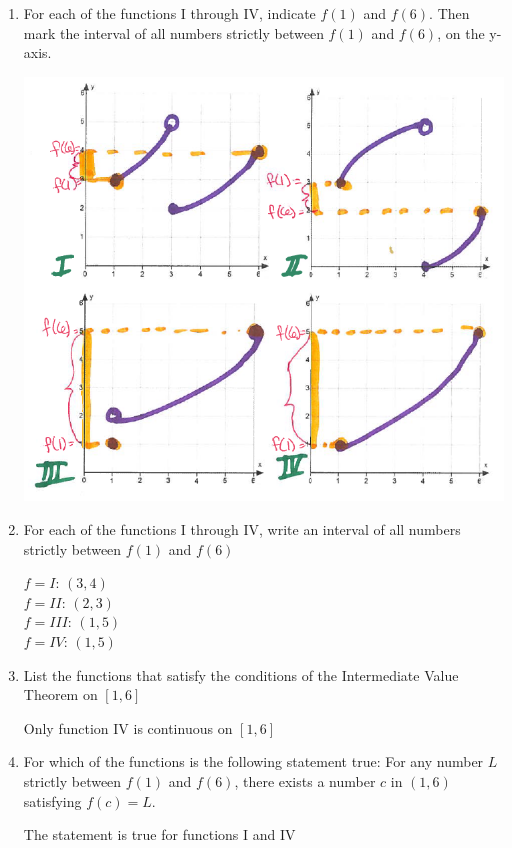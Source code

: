 \documentclass[nooutcomes]{ximera}
\begin{document}
\begin{problem}
\begin{enumerate}
\begin{enumerate}
	\item For each of the functions I through IV, indicate $f(1)$ and $f(6)$.  Then mark the interval of all numbers strictly between $f(1)$ and $f(6)$, on the y-axis.
	\begin{freeResponse} \hfil
	\begin{image}
	\includegraphics[scale=.6]{Figure4.png}
	\end{image}
	\end{freeResponse}

	\item For each of the functions I through IV, write an interval of all numbers strictly between $f(1)$ and $f(6)$
		\begin{freeResponse}
		$f=I$: $(3,4)$\\
		$f=II$: $(2,3)$\\
		$f=III$: $(1,5)$\\
		$f=IV$: $(1,5)$
		\end{freeResponse}
	\item List the functions that satisfy the conditions of the Intermediate Value Theorem on $[1,6]$
		\begin{freeResponse}
		Only function IV is continuous on $[1,6]$
		\end{freeResponse}
	\item For which of the functions is the following statement true: For any number $L$ strictly between $f(1)$ and $f(6)$, there exists a number $c$ in $(1,6)$ satisfying $f(c)=L$.
		\begin{freeResponse}
		The statement is true for functions I and IV
		\end{freeResponse}


\end{enumerate}
\end{enumerate}
\end{problem}
\end{document}
